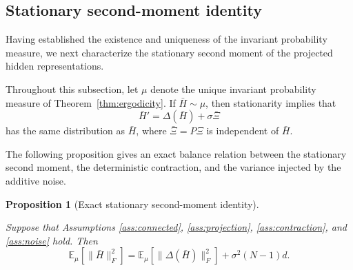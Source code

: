 \documentclass{article}
\newtheorem{proposition}[theorem]{Proposition}
\begin{document}

\subsection{Stationary second-moment identity}
\label{sec:second_moment}

Having established the existence and uniqueness of the invariant
probability measure, we next characterize the stationary second moment
of the projected hidden representations.

Throughout this subsection, let
$\mu$
denote the unique invariant probability measure of
Theorem~\ref{thm:ergodicity}.
If
\(
\bar H\sim\mu
\),
then stationarity implies that
\[
\bar H'
=
\Delta(\bar H)
+
\sigma\bar\Xi
\]
has the same distribution as
$\bar H$,
where
$\bar\Xi=P\Xi$
is independent of
$\bar H$.

The following proposition gives an exact balance relation between the
stationary second moment, the deterministic contraction, and the
variance injected by the additive noise.

\begin{proposition}[Exact stationary second-moment identity]
	\label{prop:variance_identity}
	
Suppose that Assumptions
\ref{ass:connected},
\ref{ass:projection},
\ref{ass:contraction},
and
\ref{ass:noise}
hold.	
	Then	
	\[
	\boxed{
		\mathbb E_\mu
		\!\left[
		\|\bar H\|_F^2
		\right]
		=
		\mathbb E_\mu
		\!\left[
		\|\Delta(\bar H)\|_F^2
		\right]
		+
		\sigma^2 (N-1)d.
	}
	\]	
\end{proposition}
\end{document}
